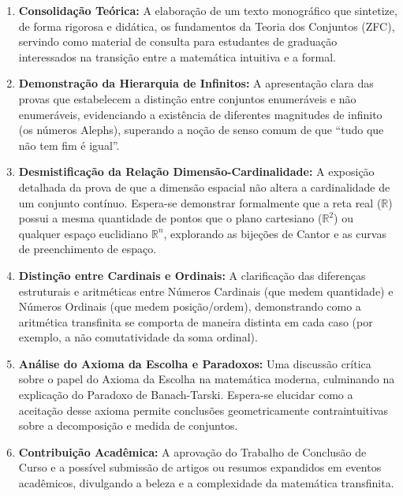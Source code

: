 \begin{enumerate}
    \item \textbf{Consolidação Teórica:} A elaboração de um texto monográfico que sintetize, de forma rigorosa e didática, os fundamentos da Teoria dos Conjuntos (ZFC), servindo como material de consulta para estudantes de graduação interessados na transição entre a matemática intuitiva e a formal.

    \item \textbf{Demonstração da Hierarquia de Infinitos:} A apresentação clara das provas que estabelecem a distinção entre conjuntos enumeráveis e não enumeráveis, evidenciando a existência de diferentes magnitudes de infinito (os números Alephs), superando a noção de senso comum de que ``tudo que não tem fim é igual''.

    \item \textbf{Desmistificação da Relação Dimensão-Cardinalidade:} A exposição detalhada da prova de que a dimensão espacial não altera a cardinalidade de um conjunto contínuo. Espera-se demonstrar formalmente que a reta real (\(\mathbb{R}\)) possui a mesma quantidade de pontos que o plano cartesiano (\(\mathbb{R}^2\)) ou qualquer espaço euclidiano \(\mathbb{R}^n\), explorando as bijeções de Cantor e as curvas de preenchimento de espaço.

    \item \textbf{Distinção entre Cardinais e Ordinais:} A clarificação das diferenças estruturais e aritméticas entre Números Cardinais (que medem quantidade) e Números Ordinais (que medem posição/ordem), demonstrando como a aritmética transfinita se comporta de maneira distinta em cada caso (por exemplo, a não comutatividade da soma ordinal).

    \item \textbf{Análise do Axioma da Escolha e Paradoxos:} Uma discussão crítica sobre o papel do Axioma da Escolha na matemática moderna, culminando na explicação do Paradoxo de Banach-Tarski. Espera-se elucidar como a aceitação desse axioma permite conclusões geometricamente contraintuitivas sobre a decomposição e medida de conjuntos.

    \item \textbf{Contribuição Acadêmica:} A aprovação do Trabalho de Conclusão de Curso e a possível submissão de artigos ou resumos expandidos em eventos acadêmicos, divulgando a beleza e a complexidade da matemática transfinita.
\end{enumerate}

